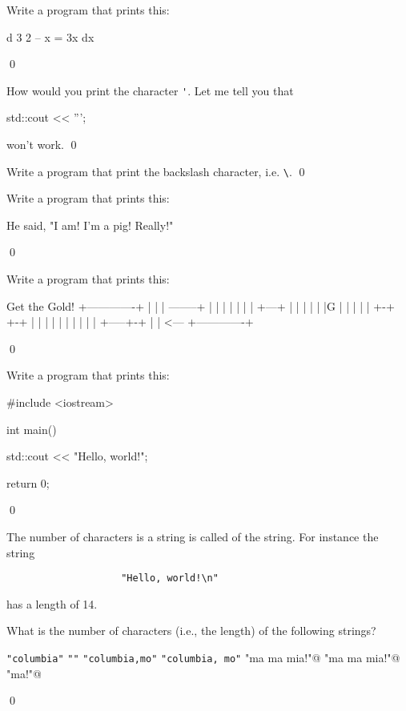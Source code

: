 \begin{ex}
Write a program that prints this:
\begin{console}
 d  3     2
-- x  = 3x
dx
\end{console}
\qed
\end{ex}


\begin{ex}
How would you print the character \verb!'!. Let me tell you that
\begin{console}
std::cout << ''';
\end{console}
won't work.
\qed
\end{ex}



\begin{ex}
Write a program that print the backslash character, i.e. \verb!\!.
\qed
\end{ex}

\begin{ex}
Write a program that prints this:
\begin{console}
He said, "I am! I'm a pig! Really!"
\end{console}
\qed
\end{ex}



\begin{ex}
Write a program that prints this:
\begin{console}
Get the Gold!
+-------------+
|             |
| --------+ | |  
|         | | |
| +---+ | | | |
| |G  | | |   |
| +-+ +-+ | | |
| | |       | |
| | +-----+-+ |
|               <---
+-------------+
\end{console}
\qed
\end{ex}


\begin{ex}
Write a program that prints this:
\begin{console}
#include <iostream>

int main()
{
    std::cout << "Hello, world!\n";

    return 0;
}
\end{console}
\qed
\end{ex}


The number of characters is a string is called 
of the string. For instance the string 
\begin{verbatim}
                    "Hello, world!\n"
\end{verbatim}
has a length of 14. 


\begin{ex}
What is the number of characters (i.e., the length) of the following strings?
\begin{tightlist}
\li \verb!"columbia"!
\li \verb!""!
\li \verb!"columbia,mo"!
\li \verb!"columbia, mo"!
\li \verb@"ma ma mia!"@
\li \verb@"ma ma mia!\n"@
\li \verb@"ma\tma\tmia!\n\n"@
\end{tightlist}
\qed
\end{ex}


